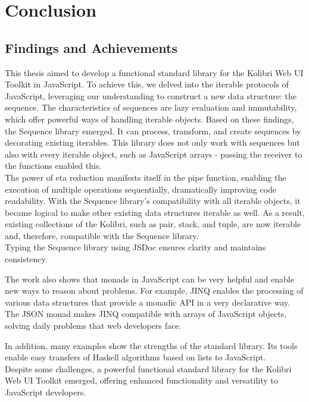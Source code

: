 \section{Conclusion}
\label{sec:conclusion}
\subsection{Findings and Achievements}
\label{sub:Findings and Achievements}
This thesis aimed to develop a functional standard library for the Kolibri Web
UI Toolkit in JavaScript. To achieve this, we delved into the iterable
protocols of JavaScript, leveraging our understanding to construct a new data
structure: the sequence. The characteristics of sequences are lazy evaluation
and immutability, which offer powerful ways of handling iterable objects. Based
on these findings, the Sequence library emerged. It can process, transform, and
create sequences by decorating existing iterables. This library does not only
work with sequences but also with every iterable object, such as JavaScript
arrays - passing the receiver to the functions enabled this.\\
The power of eta reduction manifests itself in the pipe function, enabling the
execution of multiple operations sequentially, dramatically improving code
readability. With the Sequence library’s compatibility with all iterable
objects, it became logical to make other existing data structures iterable as
well. As a result, existing collections of the Kolibri, such as pair, stack,
and tuple, are now iterable and, therefore, compatible with the Sequence
library.\\
Typing the Sequence library using JSDoc ensures clarity and maintains
consistency.

The work also shows that monads in JavaScript can be very helpful and enable
new ways to reason about problems. For example, JINQ enables the processing of
various data structures that provide a monadic API in a very declarative way.
The JSON monad makes JINQ compatible with arrays of JavaScript objects, solving
daily problems that web developers face.

In addition, many examples show the strengths of the standard library. Its
tools enable easy transfers of Haskell algorithms based on lists
to JavaScript.\\
Despite some challenges, a powerful functional standard library for the Kolibri
Web UI Toolkit emerged, offering enhanced functionality and versatility to
JavaScript developers.\\
